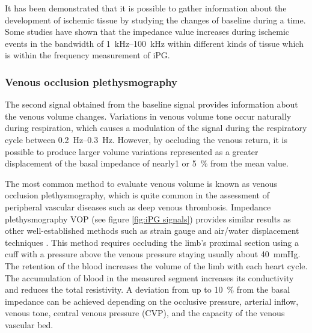 It has been demonstrated that it is possible to gather information about the development of ischemic tissue by studying the changes of baseline during a time. Some studies have shown that the impedance value increases during ischemic events in the bandwidth of \SIrange{1}{100}{\kilo\hertz} within different kinds of tissue \cite{songer2001tissue,casas1999vivo,kun1994tissue,ristic1997muscle} which is within the frequency measurement of iPG. 

\subsubsection{Venous occlusion plethysmography}
The second signal obtained from the baseline signal provides information about the venous volume changes. Variations in venous volume tone occur naturally during respiration, which causes a modulation of the signal during the respiratory cycle between \SIrange{0.2}{0.3}{\hertz}. However, by occluding the venous return, it is possible to produce larger volume variations represented as a greater displacement of the basal impedance of nearly\SI{1}{\Omega} or \SI{5}{\percent} from the mean value. 

The most common method to evaluate venous volume is known as venous occlusion plethysmography, which is quite common in the assessment of peripheral vascular diseases such as deep venous thrombosis. Impedance plethysmography VOP (see figure \ref{fig:iPG signals}) provides similar results as other well-established methods such as strain gauge\cite{schraibman1975comparison} and air/water displacement techniques \cite{fleming1986comparison}. This method requires occluding the limb's proximal section using a cuff with a pressure above the venous pressure staying usually about \SI{40}{\mmHg}.  The retention of the blood increases the volume of the limb with each heart cycle. The accumulation of blood in the measured segment increases its conductivity and reduces the total resistivity.  A deviation from up to \SI{10}{\percent} from the basal impedance can be achieved depending on the occlusive pressure, arterial inflow, venous tone, central venous pressure (CVP), and the capacity of the venous vascular bed. 

